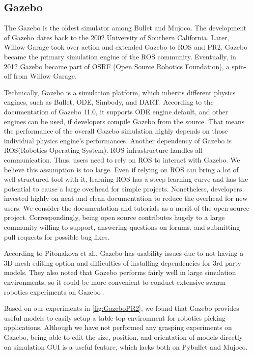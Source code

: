 \subsection{Gazebo}

The Gazebo is the oldest simulator among Bullet and Mujoco. The development of Gazebo dates back to the 2002 University of Southern California. Later, Willow Garage took over action and extended Gazebo to ROS and PR2. Gazebo became the primary simulation engine of the ROS community. Eventually, in 2012 Gazebo became part of OSRF (Open Source Robotics Foundation), a spin-off from Willow Garage.

Technically, Gazebo is a simulation platform, which inherits different physics engines, such as Bullet, ODE, Simbody, and DART. According to the documentation of Gazebo 11.0, it supports ODE engine default, and other engines can be used, if developers compile Gazebo from the source. That means the performance of the overall Gazebo simulation highly depends on those individual physics engine’s performances.  Another dependency of Gazebo is ROS(Robotics Operating System). ROS infrastructure handles all communication. Thus, users need to rely on ROS to interact with Gazebo. We believe this assumption is too large. Even if relying on ROS can bring a lot of well-structured tool with it, learning ROS has a steep learning curve and has the potential to cause a large overhead for simple projects.
Nonetheless, developers invested highly on neat and clean documentation to reduce the overhead for new users. We consider the documentation and tutorials as a merit of the open-source project. Correspondingly, being open source contributes hugely to a large community willing to support, answering questions on forums, and submitting pull requests for possible bug fixes. 

According to Pitonakova et al., Gazebo has usability issues due to not having a 3D mesh editing option and difficulties of installing dependencies for 3rd party models. They also noted that Gazebo performs fairly well in large simulation environments, so it could be more convenient to conduct extensive swarm robotics experiments on Gazebo \cite{Pitonakova2018}.  

Based on our experiments in \ref{fig:GazeboPR2}, we found that Gazebo provides useful models to easily setup a table-top environment for robotics picking applications. Although we have not performed any grasping experiments on Gazebo, being able to edit the size, position, and orientation of models directly on simulation GUI is a useful feature, which lacks both on Pybullet and Mujoco.


